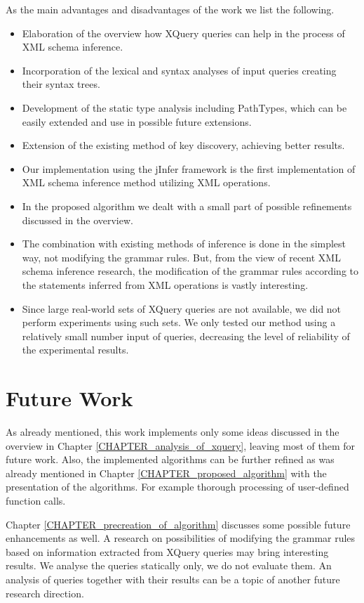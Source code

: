 As the main advantages and disadvantages of the work we list the following.
\begin{itemize}
\renewcommand{\labelitemi}{$+$}
\item Elaboration of the overview how XQuery queries can help in the process of XML schema inference.
\item Incorporation of the lexical and syntax analyses of input queries creating their syntax trees.
\item Development of the static type analysis including PathTypes, which can be easily extended and use in possible future extensions.
\item Extension of the existing method of key discovery, achieving better results.
\item Our implementation using the jInfer framework is the first implementation of XML schema inference method utilizing XML operations.
\renewcommand{\labelitemi}{$-$}
\item In the proposed algorithm we dealt with a small part of possible refinements discussed in the overview.
\item The combination with existing methods of inference is done in the simplest way, not modifying the grammar rules. But, from the view of recent XML schema inference research, the modification of the grammar rules according to the statements inferred from XML operations is vastly interesting.
\item Since large real-world sets of XQuery queries are not available, we did not perform experiments using such sets. We only tested our method using a relatively small number input of queries, decreasing the level of reliability of the experimental results.
\end{itemize}

\section{Future Work}
As already mentioned, this work implements only some ideas discussed in the overview in Chapter \ref{CHAPTER_analysis_of_xquery}, leaving most of them for future work. Also, the implemented algorithms can be further refined as was already mentioned in Chapter \ref{CHAPTER_proposed_algorithm} with the presentation of the algorithms. For example thorough processing of user-defined function calls.

Chapter \ref{CHAPTER_precreation_of_algorithm} discusses some possible future enhancements as well. A research on possibilities of modifying the grammar rules based on information extracted from XQuery queries may bring interesting results. We analyse the queries statically only, we do not evaluate them. An analysis of queries together with their results can be a topic of another future research direction.


